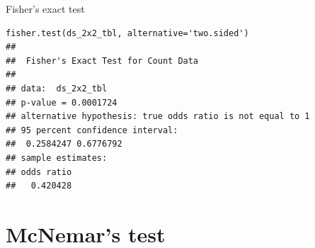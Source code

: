 \documentclass[12pt, t, xcolor=dvipsnames]{beamer}
\begin{document}
% 



\begin{frame}[fragile]{Fisher's exact test}
\begin{verbatim}
fisher.test(ds_2x2_tbl, alternative='two.sided')
## 
##  Fisher's Exact Test for Count Data
## 
## data:  ds_2x2_tbl
## p-value = 0.0001724
## alternative hypothesis: true odds ratio is not equal to 1
## 95 percent confidence interval:
##  0.2584247 0.6776792
## sample estimates:
## odds ratio 
##   0.420428
\end{verbatim}
\end{frame}







\section{McNemar's test} %
\label{sec:mcnemar_s_test}

% 
% 
\end{document}

